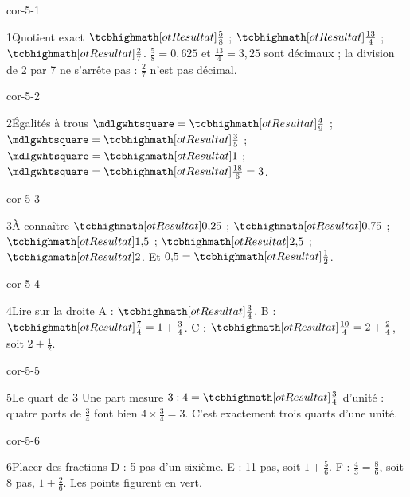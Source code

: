 \clearpage\pagestyle{otMain}\setlength{\otBlocEspacement}{2.5mm}\fontsize{11}{15}\selectfont{}
\begin{blocLivre}{cor-5-1}\begin{corrige}{1}{Quotient exact}
$\res{\frac58}$ ; $\res{\frac{13}4}$ ; $\res{\frac27}$. $\frac58=0{,}625$ et $\frac{13}4=3{,}25$ sont décimaux ; la division de 2 par 7 ne s’arrête pas : $\frac27$ n’est pas décimal.
\end{corrige}\end{blocLivre}
\begin{blocLivre}{cor-5-2}\begin{corrige}{2}{Égalités à trous}
$\square=\res{\frac49}$ ; $\square=\res{\frac35}$ ; $\square=\res1$ ; $\square=\res{\frac{18}6}=3$.
\end{corrige}\end{blocLivre}
\begin{blocLivre}{cor-5-3}\begin{corrige}{3}{À connaître}
$\res{0{,}25}$ ; $\res{0{,}75}$ ; $\res{1{,}5}$ ; $\res{2{,}5}$ ; $\res2$. Et $0{,}5=\res{\frac12}$.
\end{corrige}\end{blocLivre}
\begin{blocLivre}{cor-5-4}\begin{corrige}{4}{Lire sur la droite}
A : $\res{\frac34}$. B : $\res{\frac74}=1+\frac34$. C : $\res{\frac{10}4}=2+\frac24$, soit $2+\frac12$.
\label{fig-cor-5-4}
\end{corrige}\end{blocLivre}
\begin{blocLivre}{cor-5-5}\begin{corrige}{5}{Le quart de 3}
Une part mesure $3:4=\res{\frac34}$ d’unité : quatre parts de $\frac34$ font bien $4\times\frac34=3$. C’est exactement trois quarts d’une unité.
\label{fig-cor-5-5}
\end{corrige}\end{blocLivre}
\begin{blocLivre}{cor-5-6}\begin{corrige}{6}{Placer des fractions}
D : 5 pas d’un sixième. E : 11 pas, soit $1+\frac56$. F : $\frac43=\frac86$, soit 8 pas, $1+\frac26$. Les points figurent en vert.
\label{fig-cor-5-6}
\end{corrige}\end{blocLivre}
